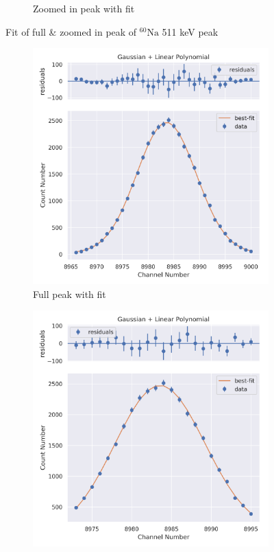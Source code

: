 \documentclass[11pt,a4paper]{article}
\newcommand{\element}[2]{$^{#2}\textrm{#1}$}
\begin{document}
\begin{figure}[H]
\begin{subfigure}{.5\linewidth}
    \caption{Zoomed in peak with fit}
  \end{subfigure}
  \caption{Fit of full \& zoomed in peak of \element{Na}{60} 511 keV peak}
\end{figure}
\begin{figure}[H]
  \centering
  \begin{subfigure}{.5\linewidth}
    \centering
    \includegraphics[width=\linewidth]{./Images/Sodium22/Linear/Linear_2_Full.png}
    \caption{Full peak with fit}
  \end{subfigure}%
  \begin{subfigure}{.5\linewidth}
    \centering
    \includegraphics[width=\linewidth]{./Images/Sodium22/Linear/Linear_2_Zoom.png}

\end{subfigure}
\end{figure}
\end{document}
